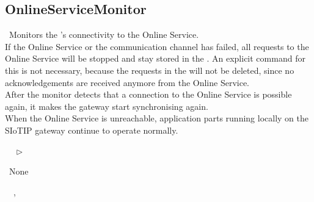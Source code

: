 \subsection{OnlineServiceMonitor}\label{comp:GatewayGatewayOnlineServiceCommunicationHandlerOnlineServiceMonitor}
	\begin{description}
		\item[Responsibility:]~Monitors the 's connectivity to the Online Service. \\
If the Online Service or the communication channel has failed, all requests to the Online Service will be stopped and stay stored in the . An explicit command for this is not necessary, because the requests in the  will not be deleted, since no acknowledgements are received anymore from the Online Service.\\
After the monitor detects that a connection to the Online Service is possible again, it makes the gateway start synchronising again. \\
When the Online Service is unreachable, application parts running locally on the SIoTIP gateway continue to operate normally.
		\item[Super-components:]~\iconcomponent{}~ $\triangleright$ \iconcomponent{}~
		\item[Sub-components:]~None
		\item[Provided interfaces:]~\iconprovided{}~, \iconprovided{}~
		\item[Required interfaces:]~\iconrequired{}~		
	\end{description}
